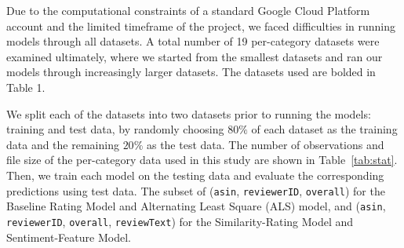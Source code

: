 \documentclass[sigconf,authorversion,nonacm]{acmart}
\begin{document}
    Due to the computational constraints of a standard Google Cloud Platform account and the limited timeframe of the project, we faced difficulties in running models through all datasets. A total number of 19 per-category datasets were examined ultimately, where we started from the smallest datasets and ran our models through increasingly larger datasets. The datasets used are bolded in Table 1. 
    
    We split each of the datasets into two datasets prior to running the models: training and test data, by randomly choosing $80\%$ of each dataset as the training data and the remaining $20\%$ as the test data. The number of observations and file size of the per-category data used in this study are shown in Table~\ref{tab:stat}. Then, we train each model on the testing data and evaluate the corresponding predictions using test data. The subset of (\verb|asin|, \verb|reviewerID|, \verb|overall|) for the Baseline Rating Model and Alternating Least Square (ALS) model, and (\verb|asin|, \verb|reviewerID|, \verb|overall|, \verb|reviewText|) for the Similarity-Rating Model and Sentiment-Feature Model.
\end{document}
